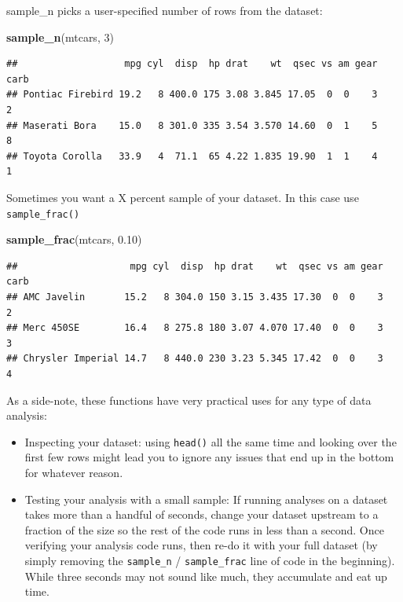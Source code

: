 \documentclass[]{book}
\newenvironment{Shaded}{\begin{snugshade}}{\end{snugshade}}
\newcommand{\DecValTok}[1]{\textcolor[rgb]{0.00,0.00,0.81}{#1}}
\newcommand{\FloatTok}[1]{\textcolor[rgb]{0.00,0.00,0.81}{#1}}
\newcommand{\KeywordTok}[1]{\textcolor[rgb]{0.13,0.29,0.53}{\textbf{#1}}}
\newcommand{\NormalTok}[1]{#1}
\providecommand{\tightlist}{%
  \setlength{\itemsep}{0pt}\setlength{\parskip}{0pt}}
\theoremstyle{definition}
\theoremstyle{definition}
\theoremstyle{definition}
\theoremstyle{remark}
\begin{document}
sample\_n picks a user-specified number of rows from the dataset:

\begin{Shaded}
\begin{Highlighting}[]
\KeywordTok{sample_n}\NormalTok{(mtcars, }\DecValTok{3}\NormalTok{)}
\end{Highlighting}
\end{Shaded}

\begin{verbatim}
##                   mpg cyl  disp  hp drat    wt  qsec vs am gear carb
## Pontiac Firebird 19.2   8 400.0 175 3.08 3.845 17.05  0  0    3    2
## Maserati Bora    15.0   8 301.0 335 3.54 3.570 14.60  0  1    5    8
## Toyota Corolla   33.9   4  71.1  65 4.22 1.835 19.90  1  1    4    1
\end{verbatim}

Sometimes you want a X percent sample of your dataset. In this case use \texttt{sample\_frac()}

\begin{Shaded}
\begin{Highlighting}[]
\KeywordTok{sample_frac}\NormalTok{(mtcars, }\FloatTok{0.10}\NormalTok{)}
\end{Highlighting}
\end{Shaded}

\begin{verbatim}
##                    mpg cyl  disp  hp drat    wt  qsec vs am gear carb
## AMC Javelin       15.2   8 304.0 150 3.15 3.435 17.30  0  0    3    2
## Merc 450SE        16.4   8 275.8 180 3.07 4.070 17.40  0  0    3    3
## Chrysler Imperial 14.7   8 440.0 230 3.23 5.345 17.42  0  0    3    4
\end{verbatim}

As a side-note, these functions have very practical uses for any type of data analysis:

\begin{itemize}
\tightlist
\item
  Inspecting your dataset: using \texttt{head()} all the same time and looking over the first few rows might lead you to ignore any issues that end up in the bottom for whatever reason.
\item
  Testing your analysis with a small sample: If running analyses on a dataset takes more than a handful of seconds, change your dataset upstream to a fraction of the size so the rest of the code runs in less than a second. Once verifying your analysis code runs, then re-do it with your full dataset (by simply removing the \texttt{sample\_n} / \texttt{sample\_frac} line of code in the beginning). While three seconds may not sound like much, they accumulate and eat up time.
\end{itemize}
\end{document}

